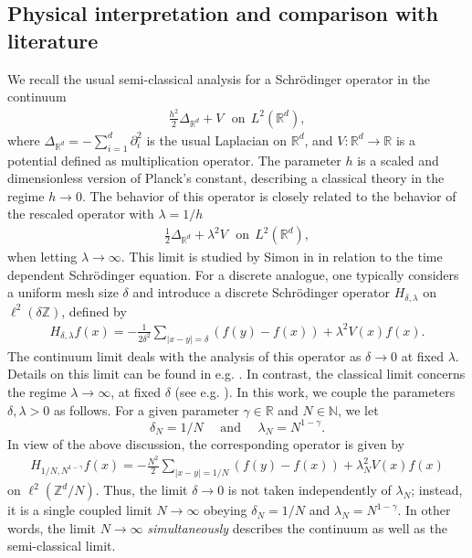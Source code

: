 \documentclass[12pt, reqno]{amsart}
\theoremstyle{definition}
\numberwithin{equation}{section}
\newcommand{\R}{{\mathbb R}}
\newcommand{\N}{{\mathbb N}}
\begin{document}
\subsection{Physical interpretation and comparison with literature}
We recall the usual semi-classical analysis for a Schr\"{o}dinger operator in the continuum
\begin{align*}%
   \frac{h^2}{2}\Delta_{\R^d}+V \ \ \ \text{on} \ \ L^2(\mathbb{R}^d),
\end{align*}
where $\Delta_{\R^d}=-\sum_{i=1}^d\partial_i^2$ is the usual Laplacian on $\mathbb{R}^d$, and $V:\R^d\to\R$ is a potential defined as multiplication operator.
The parameter $h$ is a scaled and dimensionless version of Planck's constant, describing a classical theory in the regime $h\to 0$. The behavior of this operator is closely related to the behavior of the rescaled operator with $\lambda=1/h$
\begin{align}\label{cts Schroedinger 1}
   \frac{1}{2}\Delta_{\R^d}+ {\lambda^2} V \ \ \ \text{on} \ \ L^2(\mathbb{R}^d),
\end{align}
when letting $\lambda\to\infty$. This limit is studied by Simon in \cite{Simon_1984,Simon_1985} in relation to  the time dependent Schr\"{o}dinger equation.
\newline
For a discrete analogue, one typically considers  a uniform mesh size $\delta$ and introduce a discrete Schr\"{o}dinger operator $H_{\delta,\lambda}$ on $\ell^2(\delta\mathbb{Z})$, defined by
 \begin{align*} 
     H_{\delta,\lambda}f(x)=-\frac{1}{2\delta^2}\sum_{|x-y|=\delta}(f(y)-f(x))+\lambda^2V(x)f(x).
 \end{align*}
The continuum limit deals with the analysis of this operator as $\delta\to 0$ at fixed $\lambda$. Details on this limit can be found in e.g. \cite{Isozaki_Jensen_2022,Nakamura_2021}. In contrast, the classical limit concerns the regime $\lambda\to \infty$, at fixed $\delta$ (see e.g. \cite{Bach_Pedra_Lakaev_2017}).
\newline
In this work, we couple the parameters $\delta,\lambda>0$ as follows. For a given parameter $\gamma\in \mathbb{R}$ and $N\in\N$, we let $$\delta_N=1/N\quad\mbox{ and }\quad\lambda_N=N^{1-\gamma}.$$
In view of the above discussion, the corresponding  operator is  given by
\begin{align*} 
   {  H_{1/N,N^{1-\gamma}}}f(x)=-\frac{N^2}{2}\sum_{|x-y|=1/N}(f(y)-f(x))+\lambda_N^2V(x)f(x)  
 \end{align*}
{on}  $\ell^2(\mathbb{Z}^d/N).$ Thus, the limit $\delta\to 0$ is {not} taken independently of $\lambda_N$; instead, it is a  single coupled limit $N\to\infty$ obeying $\delta_N=1/N$ and $\lambda_N=N^{1-\gamma}$. In other words, the limit $N\to\infty$  {\em simultaneously} describes the continuum as well as the semi-classical limit.
\end{document}
